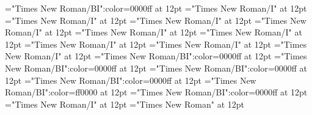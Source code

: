 \documentclass{article}
\begin{document}
 
\thispagestyle{empty} 
\font\exampleusefirstoftypelastoftypesensearticlesectionletter="Times New Roman/BI":color=0000ff at 12pt
\font\lastoftypevariantinflectionarticlesectionletter="Times New Roman/I" at 12pt
\font\variantinflectionarticlesectionletter="Times New Roman/I" at 12pt
\font\firstoftypevariantinflectionarticlesectionletter="Times New Roman/I" at 12pt
\font\firstoftypelastoftypestressfirstoftypelastoftypepronunciationarticlesectionletter="Times New Roman/I" at 12pt
\font\firstoftypelastoftypepronunciationarticlesectionletter="Times New Roman/I" at 12pt
\font\firstoftypeheadwordlastoftypearticlesectionletter="Times New Roman/I" at 12pt
\font\examplefirstoftypelastoftypesubentryarticlesectionletter="Times New Roman/I" at 12pt
\font\firstoftypeheadwordlastoftypefirstoftypelastoftypesubentryarticlesectionletter="Times New Roman/I" at 12pt
\font\firstoftypelastoftypesubentryarticlesectionletter="Times New Roman/I" at 12pt
\font\examplesensearticlesectionletter="Times New Roman/BI":color=0000ff at 12pt
\font\firstoftypelastoftypewordusedefinitionfirstoftypelastoftypesensearticlesectionletter="Times New Roman/BI":color=0000ff at 12pt
\font{}="Times New Roman/BI":color=0000ff at 12pt
\font\firstoftypegrammarcategorylastoftypesensearticlesectionletter="Times New Roman/BI":color=0000ff at 12pt
\font\sensebeforearticlesectionletter="Times New Roman/BI":color=ff0000 at 12pt
\font\sensearticlesectionletter="Times New Roman/BI":color=0000ff at 12pt
\font\articlesectionletter="Times New Roman/I" at 12pt
\font\sectionletter="Times New Roman" at 12pt
\end{document}

